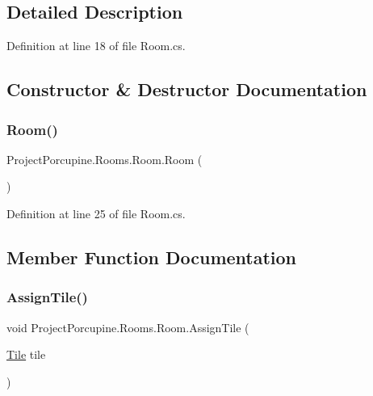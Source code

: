 \subsection{Detailed Description}


Definition at line 18 of file Room.\+cs.



\subsection{Constructor \& Destructor Documentation}
\mbox{\label{class_project_porcupine_1_1_rooms_1_1_room_a7cc8174274715699a84febf026b3fef2}} 
\subsubsection{\texorpdfstring{Room()}{Room()}}
{\footnotesize\ttfamily Project\+Porcupine.\+Rooms.\+Room.\+Room (\begin{DoxyParamCaption}{ }\end{DoxyParamCaption})}



Definition at line 25 of file Room.\+cs.



\subsection{Member Function Documentation}
\mbox{\label{class_project_porcupine_1_1_rooms_1_1_room_a802764bba9b7775f59aac5e82c656440}} 
\subsubsection{\texorpdfstring{Assign\+Tile()}{AssignTile()}}
{\footnotesize\ttfamily void Project\+Porcupine.\+Rooms.\+Room.\+Assign\+Tile (\begin{DoxyParamCaption}\item[{\hyperlink{class_tile}{Tile}}]{tile }\end{DoxyParamCaption})}



